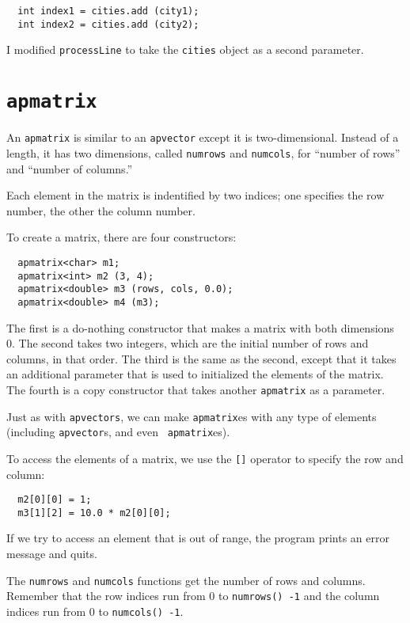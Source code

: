 \begin{verbatim}
  int index1 = cities.add (city1);
  int index2 = cities.add (city2);
\end{verbatim}
%
I modified {\tt processLine} to take the {\tt cities} object
as a second parameter.

\section {{\tt apmatrix}}

An {\tt apmatrix} is similar to an {\tt apvector} except it
is two-dimensional.  Instead of a length, it has two
dimensions, called {\tt numrows} and {\tt numcols}, for
``number of rows'' and ``number of columns.''

Each element in the matrix is indentified by two indices;
one specifies the row number, the other the column number.


To create a matrix, there are four constructors:

\begin{verbatim}
  apmatrix<char> m1;
  apmatrix<int> m2 (3, 4);
  apmatrix<double> m3 (rows, cols, 0.0);
  apmatrix<double> m4 (m3);
\end{verbatim}
%
The first is a do-nothing constructor that makes a matrix with both
dimensions 0.  The second takes two integers, which are the initial
number of rows and columns, in that order.  The third is the same as
the second, except that it takes an additional parameter that is used
to initialized the elements of the matrix.  The fourth is a copy
constructor that takes another {\tt apmatrix} as a parameter.


Just as with {\tt apvectors}, we can make {\tt apmatrix}es with any
type of elements (including {\tt apvector}s, and even {\tt
apmatrix}es).

To access the elements of a matrix, we use the {\tt []} operator
to specify the row and column:

\begin{verbatim}
  m2[0][0] = 1;
  m3[1][2] = 10.0 * m2[0][0];
\end{verbatim}
%
If we try to access an element that is out of range, the program
prints an error message and quits.


The {\tt numrows} and {\tt numcols} functions get the number of
rows and columns.  Remember that the row indices run from 0 to
{\tt numrows() -1} and the column indices run from 0 to
{\tt numcols() -1}.

